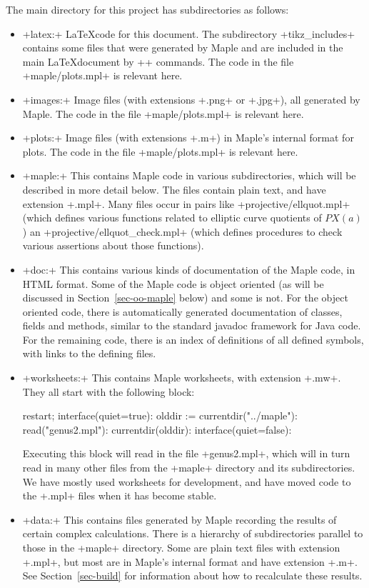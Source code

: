 \documentclass[reqno]{amsart}
\renewcommand{\:}{\colon}
\theoremstyle{definition}
\begin{document}
The main directory for this project has subdirectories as follows:
\begin{itemize}
 \item \fname+latex:+ \LaTeX code for this document.  The subdirectory
  \fname+tikz_includes+ contains some files that were generated by
  Maple and are included in the main \LaTeX document by \mcode++
  commands.  The code in the file \fname+maple/plots.mpl+ is relevant
  here.
 \item \fname+images:+ Image files (with extensions \mcode+.png+ or
  \mcode+.jpg+), all generated by Maple.  The code in the file
  \fname+maple/plots.mpl+ is relevant here.
 \item \fname+plots:+ Image files (with extensions \mcode+.m+) in
  Maple's internal format for plots.  The code in the file
  \fname+maple/plots.mpl+ is relevant here.
 \item \fname+maple:+ This contains Maple code in various
  subdirectories, which will be described in more detail below.  The
  files contain plain text, and have extension \fname+.mpl+.  Many
  files occur in pairs like \fname+projective/ellquot.mpl+ (which
  defines various functions related to elliptic curve quotients of
  $PX(a)$) an \fname+projective/ellquot_check.mpl+ (which defines
  procedures to check various assertions about those functions).
 \item \fname+doc:+ This contains various kinds of documentation of the 
  Maple code, in HTML format.  Some of the Maple code is object
  oriented (as will be discussed in Section~\ref{sec-oo-maple} below)
  and some is not.  For the object oriented code, there is
  automatically generated documentation of classes, fields and
  methods, similar to the standard javadoc framework for Java code.
  For the remaining code, there is an index of definitions of all
  defined symbols, with links to the defining files.
 \item \fname+worksheets:+ This contains Maple worksheets, with
  extension \fname+.mw+.  They all start with the following block:
  \begin{mcodeblock}
   restart;
   interface(quiet=true):
   olddir := currentdir("../maple"):
   read("genus2.mpl"):
   currentdir(olddir):
   interface(quiet=false):
  \end{mcodeblock}
  Executing this block will read in the file \fname+genus2.mpl+, which
  will in turn read in many other files from the \fname+maple+
  directory and its subdirectories.  We have mostly used worksheets
  for development, and have moved code to the \fname+.mpl+ files when
  it has become stable.
 \item \fname+data:+ This contains files generated by Maple recording
  the results of certain complex calculations.  There is a hierarchy
  of subdirectories parallel to those in the \fname+maple+ directory.
  Some are plain text files with extension \fname+.mpl+, but most are
  in Maple's internal format and have extension \fname+.m+.  See
  Section~\ref{sec-build} for information about how to recalculate
  these results.
\end{itemize}
\end{document}
